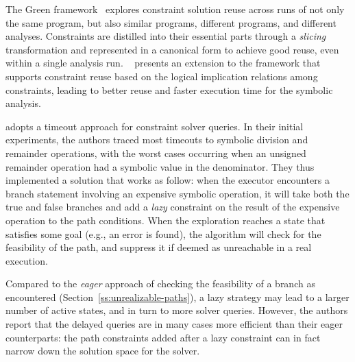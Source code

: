 The Green framework~\cite{GREEN-FSE12} explores constraint solution reuse across runs of not only the same program, but also similar programs, different programs, and different analyses. Constraints are distilled into their essential parts through a {\em slicing} transformation and represented in a canonical form to achieve good reuse, even within a single analysis run. ~\cite{JGY-ISSTA15} presents an extension to the framework that supports constraint reuse based on the logical implication relations among constraints, leading to better reuse and faster execution time for the symbolic analysis.



\cite{UCKLEE-USEC15} adopts a timeout approach for constraint solver queries. In their initial experiments, the authors traced most timeouts to symbolic division and remainder operations, with the worst cases occurring when an unsigned remainder operation had a symbolic value in the denominator.
They thus implemented a solution that works as follow: when the executor encounters a branch statement involving an expensive symbolic operation, it will take both the true and false branches and add a {\em lazy} constraint on the result of the expensive operation to the path conditions. When the exploration reaches a state that satisfies some goal (e.g., an error is found), the algorithm will check for the feasibility of the path, and suppress it if deemed as unreachable in a real execution.

Compared to the {\em eager} approach of checking the feasibility of a branch as encountered (Section~\ref{ss:unrealizable-paths}), a lazy strategy may lead to a larger number of active states, and in turn to more solver queries. However, the authors report that the delayed queries are in many cases more efficient than their eager counterparts: the path constraints added after a lazy constraint can in fact narrow down the solution space for the solver.


